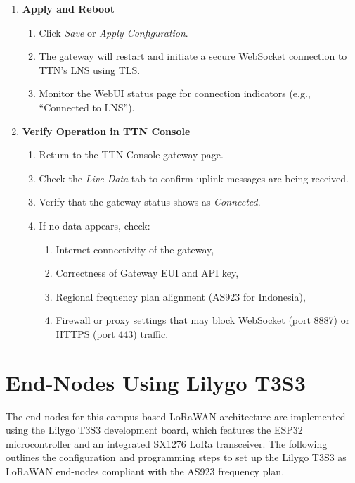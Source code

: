 \begin{enumerate}
    \item \textbf{Apply and Reboot}
          \begin{enumerate}
              \item Click \textit{Save} or \textit{Apply Configuration}.
              \item The gateway will restart and initiate a secure WebSocket connection to TTN’s LNS using TLS.
              \item Monitor the WebUI status page for connection indicators (e.g., “Connected to LNS”).
          \end{enumerate}

    \item \textbf{Verify Operation in TTN Console}
          \begin{enumerate}
              \item Return to the TTN Console gateway page.
              \item Check the \textit{Live Data} tab to confirm uplink messages are being received.
              \item Verify that the gateway status shows as \textit{Connected}.
              \item If no data appears, check:
                    \begin{enumerate}
                        \item Internet connectivity of the gateway,
                        \item Correctness of Gateway EUI and API key,
                        \item Regional frequency plan alignment (AS923 for Indonesia),
                        \item Firewall or proxy settings that may block WebSocket (port 8887) or HTTPS (port 443) traffic.
                    \end{enumerate}
          \end{enumerate}
\end{enumerate}


\section{End-Nodes Using Lilygo T3S3}
\label{sec:end_nodes_lilygo_t3s3}
The end-nodes for this campus-based LoRaWAN architecture are implemented using the Lilygo T3S3 development board, which features the ESP32 microcontroller and an integrated SX1276 LoRa transceiver. The following outlines the configuration and programming steps to set up the Lilygo T3S3 as LoRaWAN end-nodes compliant with the AS923 frequency plan.
